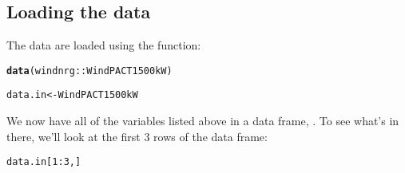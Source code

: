 \documentclass[nojss]{jss}\usepackage[]{graphicx}\usepackage[]{color}
\makeatletter
\newcommand{\hlnum}[1]{\textcolor[rgb]{0.686,0.059,0.569}{#1}}%
\newcommand{\hlopt}[1]{\textcolor[rgb]{0,0,0}{#1}}%
\newcommand{\hlstd}[1]{\textcolor[rgb]{0.345,0.345,0.345}{#1}}%
\newcommand{\hlkwb}[1]{\textcolor[rgb]{0.69,0.353,0.396}{#1}}%
\newcommand{\hlkwd}[1]{\textcolor[rgb]{0.737,0.353,0.396}{\textbf{#1}}}%
\newenvironment{kframe}{%
 \def\at@end@of@kframe{}%
 \ifinner\ifhmode%
  \def\at@end@of@kframe{\end{minipage}}%
  \begin{minipage}{\columnwidth}%
 \fi\fi%
 \def\FrameCommand##1{\hskip\@totalleftmargin \hskip-\fboxsep
 \colorbox{shadecolor}{##1}\hskip-\fboxsep
     \hskip-\linewidth \hskip-\@totalleftmargin \hskip\columnwidth}%
 \MakeFramed {\advance\hsize-\width
   \@totalleftmargin\z@ \linewidth\hsize
   \@setminipage}}%
 {\par\unskip\endMakeFramed%
 \at@end@of@kframe}
\newenvironment{knitrout}{}{} %
\makeatother
\begin{document}
\subsection{Loading the data}
The  data are loaded using the  function:
\begin{knitrout}
\color{fgcolor}\begin{kframe}
\begin{alltt}
\hlkwd{data}\hlstd{(windnrg::WindPACT1500kW)}
\end{alltt}


{\ttfamily\noindent\color{warningcolor}{\#\# Warning: data set 'windnrg::WindPACT1500kW' not found}}\begin{alltt}
\hlstd{data.in} \hlkwb{<-} \hlstd{WindPACT1500kW}
\end{alltt}


{\ttfamily\noindent\bfseries\color{errorcolor}{\#\# Error: object 'WindPACT1500kW' not found}}\end{kframe}
\end{knitrout}

We now have all of the variables listed above in a data frame, . To see what's in there, we'll look at the first 3 rows of the data frame:
 
\begin{knitrout}
\color{fgcolor}\begin{kframe}
\begin{alltt}
\hlstd{data.in[}\hlnum{1}\hlopt{:}\hlnum{3}\hlstd{,]}
\end{alltt}


{\ttfamily\noindent\bfseries\color{errorcolor}{\#\# Error: object 'data.in' not found}}\end{kframe}
\end{knitrout}

%

\end{document}
